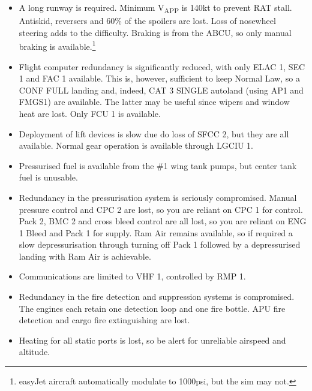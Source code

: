 \documentclass[a5paper,11pt,twoside]{book}
\newcommand{\inlcite}[1]{{\footnotesize\scshape\MakeLowercase{[#1]}}}
\newcommand{\multicite}[1]{%

  \nopagebreak
  \noindent{{\color{blue}\inlcite{#1}}}
}
\newcommand{\V}[1]{V\textsubscript{#1}}
\begin{document}
\begin{itemize}

\item A long runway is required. Minimum \V{APP} is 140kt to prevent RAT
  stall. Antiskid, reversers and 60\% of the spoilers are lost. Loss of
  nosewheel steering adds to the difficulty. Braking is from the ABCU, so only
  manual braking is available.\footnote{easyJet aircraft automatically modulate
  to 1000psi, but the sim may not.}

  \item Flight computer redundancy is significantly reduced, with only ELAC 1,
    SEC 1 and FAC 1 available. This is, however, sufficient to keep Normal Law,
    so a CONF FULL landing and, indeed, CAT 3 SINGLE autoland (using AP1 and
    FMGS1) are available. The latter may be useful since wipers and window heat
    are lost. Only FCU 1 is available.

  \item Deployment of lift devices is slow due do loss of SFCC 2, but they are
    all available. Normal gear operation is available through LGCIU 1.

  \item Pressurised fuel is available from the \#1 wing tank pumps, but center
    tank fuel is unusable.

  \item Redundancy in the pressurisation system is seriously compromised. Manual
    pressure control and CPC 2 are lost, so you are reliant on CPC 1 for
    control. Pack 2, BMC 2 and cross bleed control are all lost, so you are
    reliant on ENG 1 Bleed and Pack 1 for supply. Ram Air remains available, so
    if required a slow depressurisation through turning off Pack 1 followed by a
    depressurised landing with Ram Air is achievable.

  \item Communications are limited to VHF 1, controlled by RMP 1.

  \item Redundancy in the fire detection and suppression systems is
    compromised. The engines each retain one detection loop and one fire
    bottle. APU fire detection and cargo fire extinguishing are lost.

  \item Heating for all static ports is lost, so be alert for unreliable
    airspeed and altitude.
\end{itemize}

\multicite{\uline{ELEC}~DC~EMER~CONFIG, FCOM~PRO.AEP.ELEC}
\end{document}
